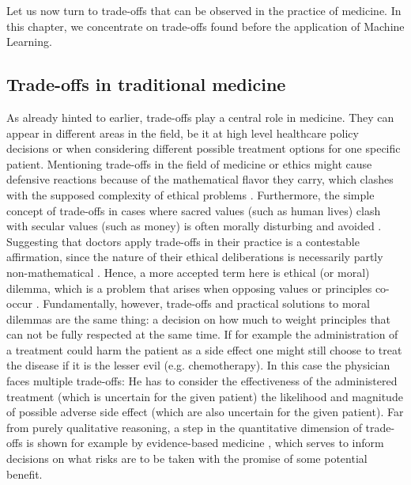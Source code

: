 Let us now turn to trade-offs that can be observed in the practice of medicine.
In this chapter, we concentrate on trade-offs found before the application of Machine Learning.


\subsection{Trade-offs in traditional medicine}
    As already hinted to earlier, trade-offs play a central role in medicine.
	They can appear in different areas in the field, be it at high level healthcare policy decisions or when considering different possible treatment options for one specific patient.
    Mentioning trade-offs in the field of medicine or ethics might cause defensive reactions because of the mathematical flavor they carry, which clashes with the supposed complexity of ethical problems \cite{Williamson2021}.
    Furthermore, the simple concept of trade-offs in cases where sacred values (such as human lives) clash with secular values (such as money) is often morally disturbing and avoided \cite{Tetlock2003}.
    Suggesting that doctors apply trade-offs in their practice is a contestable affirmation, since the nature of their ethical deliberations is necessarily partly non-mathematical \cite{Zerilli2019}.
    Hence, a more accepted term here is ethical (or moral) dilemma, which is a problem that arises when opposing values or principles co-occur \cite{Dijkstra2020}.
    Fundamentally, however, trade-offs and practical solutions to moral dilemmas are the same thing: a decision on how much to weight principles that can not be fully respected at the same time.
    If for example the administration of a treatment could harm the patient as a side effect one might still choose to treat the disease if it is the lesser evil (e.g. chemotherapy\cite{oronsky2016medical}).
    In this case the physician faces multiple trade-offs:
	He has to consider the effectiveness of the administered treatment (which is uncertain for the given patient) the likelihood and magnitude of possible adverse side effect (which are also uncertain for the given patient).
    Far from purely qualitative reasoning, a step in the quantitative dimension of trade-offs is shown for example by evidence-based medicine \cite{Launer2020}, which serves to inform decisions on what risks are to be taken with the promise of some potential benefit.

